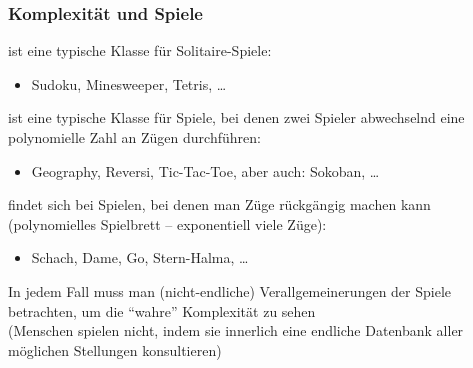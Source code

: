 \documentclass[onlymath]{beamer}
\begin{document}
\maketitle

\begin{frame}\frametitle{Komplexität und Spiele}

\alert{\NP} ist eine typische Klasse für Solitaire-Spiele:
\begin{itemize}
\item Sudoku, Minesweeper, Tetris, \ldots
\end{itemize}
\bigskip\pause

\alert{\PSpace} ist eine typische Klasse für Spiele, bei denen zwei Spieler
abwechselnd eine polynomielle Zahl an Zügen durchführen:
\begin{itemize}
\item Geography, Reversi, Tic-Tac-Toe, aber auch: Sokoban, \ldots
\end{itemize}
\bigskip\pause

\alert{\ExpTime} findet sich bei Spielen, bei denen man Züge rückgängig machen kann (polynomielles Spielbrett -- exponentiell viele Züge):
\begin{itemize}
\item Schach, Dame, Go, Stern-Halma, \ldots
\end{itemize}
\smallskip

In jedem Fall muss man (nicht-endliche) Verallgemeinerungen der Spiele betrachten,
um die "`wahre"' Komplexität zu sehen\\ {\tiny(Menschen spielen nicht, indem sie
innerlich eine endliche Datenbank aller möglichen Stellungen konsultieren)}
\smallskip\pause



\end{frame}

\end{document}
